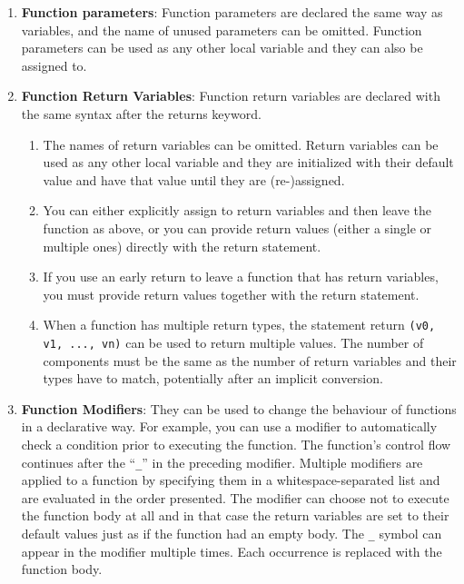 \begin{enumerate}
\item\textbf{Function parameters}: Function parameters are declared the same way as variables, and the name of unused parameters can be omitted. Function parameters can be used as any other local variable and they can also be assigned to.

\item\textbf{Function Return Variables}: Function return variables are declared with the same syntax after the returns keyword.
    \begin{enumerate}
    \item The names of return variables can be omitted. Return variables can be used as any other local variable and they are initialized with their default value and have that value until they are (re-)assigned.
    \item You can either explicitly assign to return variables and then leave the function as above, or you can provide return values (either a single or multiple ones) directly with the return statement.
    \item If you use an early return to leave a function that has return variables, you must provide return values together with the return statement.
    \item When a function has multiple return types, the statement return \verb|(v0, v1, ..., vn)| can be used to return multiple values. The number of components must be the same as the number of return variables and their types have to match, potentially after an implicit conversion.
    \end{enumerate}

\item\textbf{Function Modifiers}: They can be used to change the behaviour of functions in a declarative way. For example, you can use a modifier to automatically check a condition prior to executing the function. The function’s control flow continues after the “\verb|_|” in the preceding modifier. Multiple modifiers are applied to a function by specifying them in a whitespace-separated list and are evaluated in the order presented. The modifier can choose not to execute the function body at all and in that case the return variables are set to their default values just as if the function had an empty body. The \verb|_| symbol can appear in the modifier multiple times. Each occurrence is replaced with the function body.


\end{enumerate}
